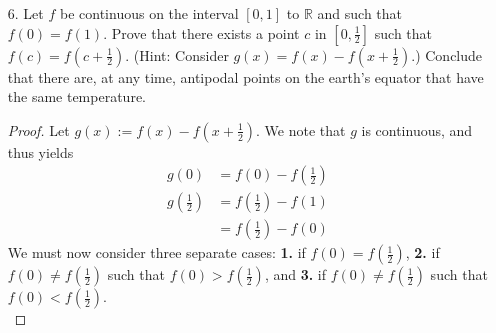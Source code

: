 \documentclass[12pt,letterpaper]{article}
\newcommand{\st}{\ \text{s.t.}\ }
\newcommand{\R}{\mathbb{R}}
\newcommand{\N}{\mathbb{N}}
\theoremstyle{case}
\theoremstyle{definition}
\newtheorem*{theorem*}{Theorem}
\begin{document}
\begin{enumerate}
\begin{enumerate}
				\begin{proof}
					Let $x_1 \in I$ be arbitrary. For $x_1,\ \exists\ x_2 \in I \st$
					\[|f(x_2)|\leq \frac{1}{2}f(x_1)\]
					By method of Mathematical Induction, we find a sequence $(x_n) \subseteq I$ such that
					\[|f(x_{n+1})| \leq \frac{1}{2}|f(x_n)|,\ \forall\ n \in \N\]
					Thus,
					\[|f(x_{n+1})| \leq \frac{1}{2}|f(x_n)| \leq \left(\frac{1}{2}\right)^2 \leq \dots \leq \left(\frac{1}{2}\right)^n|f(x_1)|\ \ (1)\]
					Recall the \textit{Bolzano-Weirstrass Theorem}:
					\begin{theorem*}
						A bounded sequence of real numbers has a convergent subsequence.
					\end{theorem*}
					Then, by the \textit{Bolzano-Wierstrass Theorem} there exists a subsequence $(x_{p(n)})$ of $(x_n)$ which converges to $c \in I$. Since $f$ is continuous, then $(f(x_{p(n)}))$ is also convergent and converges to $f(c)$. Because of $(1)$ we have
					\[\lim\limits_{n \to \infty} f(x_{p(n)})=0\]
					$\therefore f(c)=0\ \& \ c \in I$.
				\end{proof}
				
				\item[6.] Let $f$ be continuous on the interval $[0,1]$ to $\R$ and such that $f(0)=f(1)$. Prove that there exists a point $c$ in $[0, \frac{1}{2}]$ such that $f(c)=f(c+\frac{1}{2})$. (Hint: Consider $g(x)=f(x)-f(x+\frac{1}{2})$.) Conclude that there are, at any time, antipodal points on the earth's equator that have the same temperature.
				
				\begin{proof}
					Let $g(x):=f(x)-f(x+\frac{1}{2})$. We note that $g$ is continuous, and thus yields
					\begin{align*}
						g(0) &= f(0)-f\left(\frac{1}{2}\right) \\
						g\left(\frac{1}{2}\right) &= f\left(\frac{1}{2}\right) - f(1) \\
						&= f\left(\frac{1}{2}\right)-f(0)
					\end{align*}
					We must now consider three separate cases: \textbf{1.} if $f(0) = f(\frac{1}{2})$, \textbf{2.} if $f(0)\neq f(\frac{1}{2})$ such that $f(0)>f(\frac{1}{2})$, and \textbf{3.} if $f(0) \neq f(\frac{1}{2})$ such that $f(0)<f(\frac{1}{2})$.\\
					

\end{proof}
\end{enumerate}
\end{enumerate}
\end{document}
